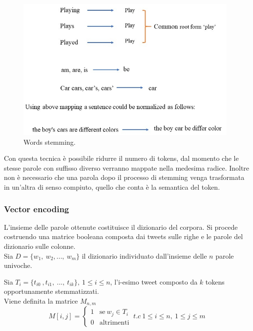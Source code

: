 \documentclass[oneside]{book}
\begin{document}
\begin{figure}[!h]
	\centering
	\includegraphics[width=11cm]{assets/stemming.jpg}

	\caption[Caption for LOF]{Words stemming. \footnotemark}
	\label{fig:stemming}
\end{figure}




Con questa tecnica è possibile ridurre il numero di tokens, dal momento che le stesse parole con suffisso diverso verranno mappate nella medesima radice. Inoltre non è necessario che una parola dopo il processo di stemming venga trasformata in un'altra di senso compiuto, quello che conta è la semantica del token.


\subsubsection{Vector encoding}

L'insieme delle parole ottenute costituisce il dizionario del corpora. Si procede costruendo una matrice booleana composta dai tweets sulle righe e le parole del dizionario sulle colonne.\\

Sia $D = \{w_1,\ w_2, ...,\ w_m\}$ il dizionario individuato dall'insieme delle $n$ parole univoche.

Sia $T_i = \{t_{i0}\ ,t_{i1},\ ...,\ t_{ik}\}, \ 1 \leq i \leq n$, l'i-esimo tweet composto da $k$ tokens opportunamente stemmatizzati.\\
Viene definita la matrice $M_{n,m}$
\[
M[i,j] =
\begin{cases}
1 & \text{se}\ w_j \in T_i\\
0 & \text{altrimenti}
\end{cases}
\ t.c\ 1\leq i\leq n,\ 1 \leq j \leq m
\]
\end{document}
